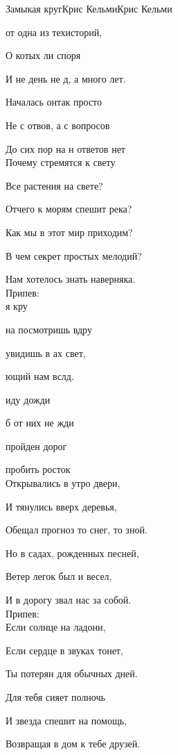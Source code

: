\documentclass[11pt,a5paper]{book}
\renewcommand{\tt}{\indent \indent}
\begin{document}
\begin{song}{Замыкая круг}{}{Крис Кельми}{Крис Кельми}{}{}

от одна из техисторий,\par
О котых ли споря\par
И не день не д, а много лет.\par
Началась онтак просто\par
Не с отвов, а с вопросов\par
До сих пор на н ответов нет\\

Почему стремятся к свету\par
Все растения на свете?\par
Отчего к морям спешит река?\par 
Как мы в этот мир приходим?\par
В чем секрет простых мелодий?\par
Нам хотелось знать наверняка.\\

Припев:\\

я кру\par 
{} на посмотришь вдру\par
{} увидишь в ах свет,\par
{}ющий нам вслд.\par
{} иду дожди \par
{} б от них не жди\par
{} пройден дорог \par
{} пробить росток\\

Открывались в утро двери,\par
И тянулись вверх деревья,\par
Обещал прогноз то снег, то зной.\par
Но в садах, рожденных песней, \par
Ветер легок был и весел,\par
И в дорогу звал нас за собой.\\

Припев:\\

Если солнце на ладони,\par
Если сердце в звуках тонет,\par
Ты потерян для обычных дней.\par
Для тебя сияет полночь\par
И звезда спешит на помощь,\par
Возвращая в дом к тебе друзей.\\


\end{song}
\end{document}
